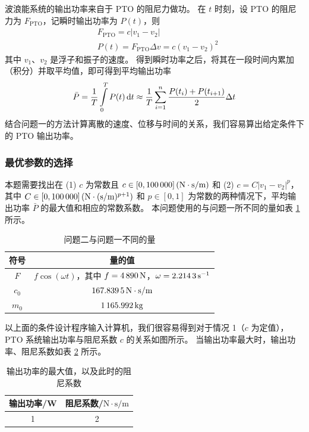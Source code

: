 波浪能系统的输出功率来自于 PTO 的阻尼力做功。
在 $t$ 时刻，设 PTO 的阻尼力为 $F_\text{PTO}$，记瞬时输出功率为 $P(t)$，则
    \begin{align}
        & F_\text{PTO}=c|v_1-v_2| \\
        & P(t)=F_\text{PTO}\Delta v=c(v_1-v_2)^2
    \end{align}
其中 $v_1$、$v_2$ 是浮子和振子的速度。
得到瞬时功率之后，将其在一段时间内累加（积分）并取平均值，即可得到平均输出功率
\begin{equation}
    \bar{P}=\dfrac{1}{T}\int\limits_0^TP(t)\mathop{}\!\mathrm{d} t\approx\dfrac{1}{T}\sum_{i=1}^n\dfrac{P(t_i)+P(t_{i+1})}{2}\Delta t
\end{equation}
结合问题一的方法计算离散的速度、位移与时间的关系，我们容易算出给定条件下的 PTO 输出功率。

\subsubsection{最优参数的选择}

本题需要找出在 (1) $c$ 为常数且 $c\in[0, \N{100000}]\,(\mathrm{N}\cdot\mathrm{s}/\mathrm{m})$ 和 (2) $c=C|v_1-v_2|^p$，其中 $C\in[0, \N{100000}]\,(\mathrm{N}\cdot(\mathrm{s}/\mathrm{m})^{p+1})$ 和 $p\in[0, 1]$ 为常数的两种情况下，平均输出功率 $\bar{P}$ 的最大值和相应的常数系数。
本问题使用的与问题一所不同的量如表 \ref{consts-2} 所示。
\begin{table}[htbp]
    \centering
    \begin{tabular}{cc}
        \toprule
        符号 & 量的值 \\
        \midrule
        $F$ & $f\cos(\omega t)$，其中 $f=\N{4890}\,\mathrm{N}$，$\omega=\N{2.2143}\,\mathrm{s}^{-1}$ \\
        $c_0$ & $\N{167.8395}\,\mathrm{N}\cdot\mathrm{s}/\mathrm{m}$ \\
        $m_0$ & $\N{1165.992}\,\mathrm{kg}$ \\
        \bottomrule
    \end{tabular}
    \caption{问题二与问题一不同的量}
    \label{consts-2}
\end{table}

以上面的条件设计程序输入计算机，我们很容易得到对于情况 1（$c$ 为定值），PTO 系统输出功率与阻尼系数 $c$ 的关系如图所示。
当输出功率最大时，输出功率、阻尼系数如表 \ref{answer-2-1} 所示。
\begin{table}[htbp]
    \centering
    \begin{tabular}{cc}
        \toprule
        输出功率/W & 阻尼系数/$\mathrm{N}\cdot\mathrm{s}/\mathrm{m}$ \\
        \midrule
        1 & 2 \\
        \bottomrule
    \end{tabular}
    \caption{输出功率的最大值，以及此时的阻尼系数}
    \label{answer-2-1}
\end{table}

